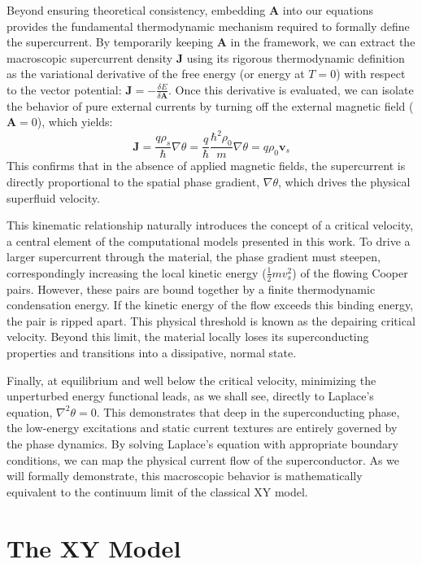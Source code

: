 \documentclass[english,binding=0.6cm,noexaminfo]{sapthesis}
\newcommand{\rhos}{\rho_s}
\begin{document}
Beyond ensuring theoretical consistency, embedding $\mathbf{A}$ into our equations provides the fundamental thermodynamic mechanism required to formally define the supercurrent. By temporarily keeping $\mathbf{A}$ in the framework, we can extract the macroscopic supercurrent density $\mathbf{J}$ using its rigorous thermodynamic definition as the variational derivative of the free energy (or energy at $T=0$) with respect to the vector potential: $\mathbf{J} = -\frac{\delta E}{\delta \mathbf{A}}$. Once this derivative is evaluated, we can isolate the behavior of pure external currents by turning off the external magnetic field ($\mathbf{A} = 0$), which yields:
\begin{equation}
    \mathbf{J} = \frac{q \rhos}{\hbar} \nabla\theta =\frac{q}{\hbar}\frac{\hbar^2\rho_0}{m}\nabla\theta= q \rho_0 \mathbf{v}_s
    \label{velocity}
\end{equation}
This confirms that in the absence of applied magnetic fields, the supercurrent is directly proportional to the spatial phase gradient, $\nabla\theta$, which drives the physical superfluid velocity.

This kinematic relationship naturally introduces the concept of a critical velocity, a central element of the computational models presented in this work. To drive a larger supercurrent through the material, the phase gradient must steepen, correspondingly increasing the local kinetic energy ($\frac{1}{2}mv_s^2$) of the flowing Cooper pairs. However, these pairs are bound together by a finite thermodynamic condensation energy. If the kinetic energy of the flow exceeds this binding energy, the pair is ripped apart. This physical threshold is known as the depairing critical velocity. Beyond this limit, the material locally loses its superconducting properties and transitions into a dissipative, normal state.

Finally, at equilibrium and well below the critical velocity, minimizing the unperturbed energy functional leads, as we shall see, directly to Laplace's equation, $\nabla^2\theta = 0$. This demonstrates that deep in the superconducting phase, the low-energy excitations and static current textures are entirely governed by the phase dynamics. By solving Laplace's equation with appropriate boundary conditions, we can map the physical current flow of the superconductor. As we will formally demonstrate, this macroscopic behavior is mathematically equivalent to the continuum limit of the classical XY model.

\section{The XY Model}
\end{document}
